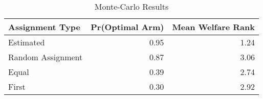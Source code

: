 
\begin{table}
    \caption{Monte-Carlo Results}
\centering
\begin{tabular}{lrr}
\toprule
Assignment Type & Pr(Optimal Arm) & Mean Welfare Rank\\
\midrule
Estimated & 0.95 & 1.24\\
Random Assignment & 0.87 & 3.06\\
Equal & 0.39 & 2.74\\
First & 0.30 & 2.92\\
\bottomrule
\end{tabular}
\end{table}